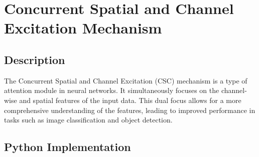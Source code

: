 \chapter{Concurrent Spatial and Channel Excitation Mechanism}

\section{Description}
The Concurrent Spatial and Channel Excitation (CSC) mechanism is a type of attention module in neural networks. It simultaneously focuses on the channel-wise and spatial features of the input data. This dual focus allows for a more comprehensive understanding of the features, leading to improved performance in tasks such as image classification and object detection.

\section{Python Implementation}
